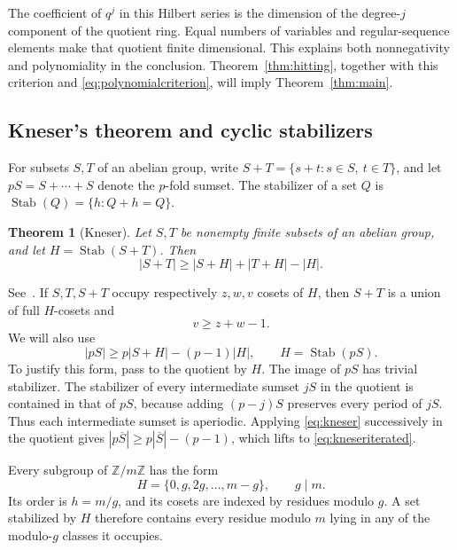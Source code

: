 \documentclass[11pt,a4paper]{article}
\numberwithin{equation}{section}
\newtheorem{theorem}{Theorem}[section]
\theoremstyle{remark}
\newcommand{\Z}{\mathbb Z}
\DeclareMathOperator{\Stab}{Stab}
\begin{document}
The coefficient of $q^j$ in this Hilbert series is the dimension of
the degree-$j$ component of the quotient ring. Equal numbers of variables
and regular-sequence elements make that quotient finite dimensional.
This explains both nonnegativity and polynomiality in the conclusion.
Theorem~\ref{thm:hitting}, together with this criterion and
\eqref{eq:polynomialcriterion}, will imply Theorem~\ref{thm:main}.

\subsection{Kneser's theorem and cyclic stabilizers}

For subsets $S,T$ of an abelian group, write
$S+T=\{s+t:s\in S,\ t\in T\}$, and let
$pS=S+\cdots+S$ denote the $p$-fold sumset. The stabilizer of a set $Q$
is $\Stab(Q)=\{h:Q+h=Q\}$.

\begin{theorem}[Kneser]\label{thm:kneser}
Let $S,T$ be nonempty finite subsets of an abelian group, and let
$H=\Stab(S+T)$. Then
\begin{equation}\label{eq:kneser}
  |S+T|\ge |S+H|+|T+H|-|H|.
\end{equation}
\end{theorem}

See~\cite[Theorem~1]{DeVos}. If $S,T,S+T$ occupy respectively $z,w,v$
cosets of $H$, then $S+T$ is a union of full $H$-cosets and
\begin{equation}\label{eq:knesercosets}
  v\ge z+w-1.
\end{equation}
We will also use
\begin{equation}\label{eq:kneseriterated}
  |pS|\ge p|S+H|-(p-1)|H|,
  \qquad H=\Stab(pS).
\end{equation}
To justify this form, pass to the quotient by $H$.
The image of $pS$ has trivial stabilizer. The stabilizer of every
intermediate sumset $jS$ in the quotient is contained in that of $pS$,
because adding $(p-j)S$ preserves every period of $jS$.
Thus each intermediate sumset is aperiodic. Applying
\eqref{eq:kneser} successively in the quotient gives
$|p\overline S|\ge p|\overline S|-(p-1)$, which lifts to
\eqref{eq:kneseriterated}.

Every subgroup of $\Z/m\Z$ has the form
\begin{equation}\label{eq:cyclicsubgroup}
  H=\{0,g,2g,\ldots,m-g\},\qquad g\mid m.
\end{equation}
Its order is $h=m/g$, and its cosets are indexed by residues modulo $g$.
A set stabilized by $H$ therefore contains every residue modulo $m$
lying in any of the modulo-$g$ classes it occupies.
\end{document}
